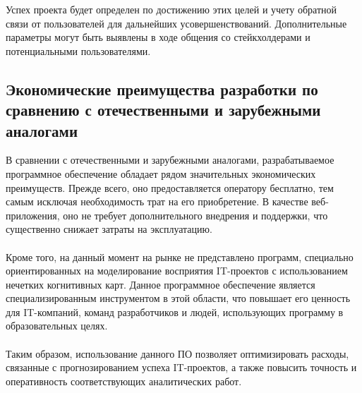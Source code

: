\documentclass{article}
\begin{document}
    Успех проекта будет определен по достижению этих целей и учету обратной связи от пользователей для дальнейших усовершенствований. Дополнительные параметры могут быть выявлены в ходе общения со стейкхолдерами и потенциальными пользователями.
    \subsection {Экономические преимущества разработки по сравнению с отечественными и зарубежными аналогами}
    В сравнении с отечественными и зарубежными аналогами, разрабатываемое программное обеспечение обладает рядом значительных экономических преимуществ. Прежде всего, оно предоставляется оператору бесплатно, тем самым исключая необходимость трат на его приобретение. В качестве веб-приложения, оно не требует дополнительного внедрения и поддержки, что существенно снижает затраты на эксплуатацию.\\
    ~\\
    Кроме того, на данный момент на рынке не представлено программ, специально ориентированных на моделирование восприятия IT-проектов с использованием нечетких когнитивных карт. Данное программное обеспечение является специализированным инструментом в этой области, что повышает его ценность для IT-компаний, команд разработчиков и людей, использующих программу в образовательных целях.\\
    ~\\
    Таким образом, использование данного ПО позволяет оптимизировать расходы, связанные с прогнозированием успеха IT-проектов, а также повысить точность и оперативность соответствующих аналитических работ.
    \newpage
\end{document}
